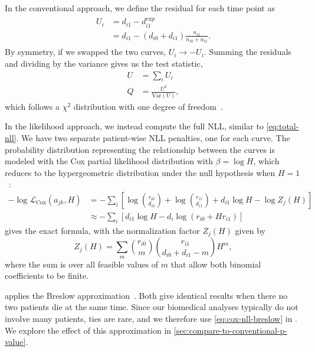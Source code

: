 \documentclass[article]{jss}
\begin{document}
In the conventional approach, we define the residual for each time point as
\begin{align}
\begin{aligned}
U_i&=d_{i1} - d_{i1}^\text{exp} \\
&=d_{i1} - (d_{i0} + d_{i1})\frac{n_{i1}}{n_{i0}+n_{i1}}.
\end{aligned}
\end{align}
By symmetry, if we swapped the two curves, \(U_i\rightarrow-U_i\). Summing the residuals and dividing by the variance gives us the test statistic,
\begin{align}
U&=\sum_i U_i \\
Q&=\frac{U^2}{\text{Var}(U)},
\end{align}
which follows a \(\chi^2\) distribution with one degree of freedom~\citep[pp.~45--47]{mantel1966evaluation,peto1972asymptotically,appliedsurvivalanalysis}.

In the likelihood approach, we instead compute the full NLL, similar to \cref{eq:total-nll}. We have two separate patient-wise NLL penalties, one for each curve. The probability distribution representing the relationship between the curves is modeled with the Cox partial likelihood distribution with \(\beta=\log{H}\), which reduces to the hypergeometric distribution under the null hypothesis when \(H=1\)~\citep{cox1972regression,breslow1974covariance}:
\begin{align}
-\log \mathcal{L}_{\text{Cox}}(a_{jk}, H)&=-\sum_i\left[\log\binom{r_{i0}}{d_{i0}}+\log\binom{r_{i1}}{d_{i1}}+d_{i1}\log H-\log Z_j(H)\right] \label{eq:cox-nll-exact}\\
&\approx-\sum_i \left[d_{i1} \log H - d_i \log\left(r_{i0} + H r_{i1}\right)\right] \label{eq:cox-nll-breslow}
\end{align}
 gives the exact formula, with the normalization factor \(Z_j(H)\) given by
\begin{equation}
Z_j(H) = \sum_{m}\binom{r_{i0}}{m}\binom{r_{i1}}{d_{i0}+d_{i1}-m}H^m,
\label{eq:cox-normalization}
\end{equation}
where the sum is over all feasible values of \(m\) that allow both binomial coefficients to be finite.

 applies the Breslow approximation~\citep{breslow1974covariance}. Both give identical results when there no two patients die at the same time. Since our biomedical analyses typically do not involve many patients, ties are rare, and we therefore use \cref{eq:cox-nll-breslow} in . We explore the effect of this approximation in \cref{sec:compare-to-conventional-p-value}.
\end{document}
